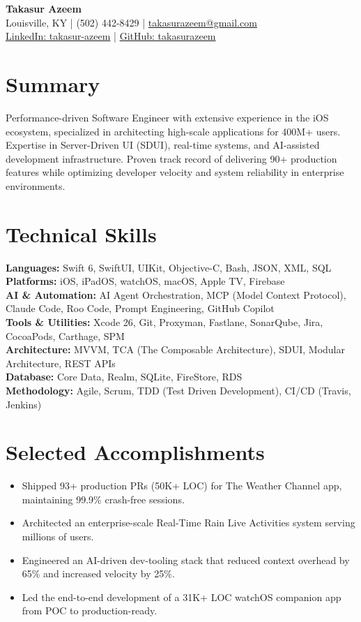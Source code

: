 \documentclass[letter,10pt]{article}
\begin{document}
\begin{center}
    {\huge \textbf{Takasur Azeem}} \\
    Louisville, KY | (502) 442-8429 | \href{mailto:takasurazeem@gmail.com}{takasurazeem@gmail.com} \\
    \href{https://linkedin.com/in/takasur-azeem}{LinkedIn: takasur-azeem} | \href{https://github.com/takasurazeem}{GitHub: takasurazeem}
\end{center}

\section*{Summary}
Performance-driven Software Engineer with extensive experience in the iOS ecosystem, specialized in architecting high-scale applications for 400M+ users. Expertise in Server-Driven UI (SDUI), real-time systems, and AI-assisted development infrastructure. Proven track record of delivering 90+ production features while optimizing developer velocity and system reliability in enterprise environments.

\section*{Technical Skills}
\noindent\textbf{Languages:} Swift 6, SwiftUI, UIKit, Objective-C, Bash, JSON, XML, SQL \\
\textbf{Platforms:} iOS, iPadOS, watchOS, macOS, Apple TV, Firebase \\
\textbf{AI \& Automation:} AI Agent Orchestration, MCP (Model Context Protocol), Claude Code, Roo Code, Prompt Engineering, GitHub Copilot \\
\textbf{Tools \& Utilities:} Xcode 26, Git, Proxyman, Fastlane, SonarQube, Jira, CocoaPods, Carthage, SPM \\
\textbf{Architecture:} MVVM, TCA (The Composable Architecture), SDUI, Modular Architecture, REST APIs \\
\textbf{Database:} Core Data, Realm, SQLite, FireStore, RDS \\
\textbf{Methodology:} Agile, Scrum, TDD (Test Driven Development), CI/CD (Travis, Jenkins)

\section*{Selected Accomplishments}
\begin{itemize}[noitemsep, topsep=0pt]
    \item Shipped 93+ production PRs (50K+ LOC) for The Weather Channel app, maintaining 99.9\% crash-free sessions.
    \item Architected an enterprise-scale Real-Time Rain Live Activities system serving millions of users.
    \item Engineered an AI-driven dev-tooling stack that reduced context overhead by 65\% and increased velocity by 25\%.
    \item Led the end-to-end development of a 31K+ LOC watchOS companion app from POC to production-ready.
\end{itemize}
\end{document}
